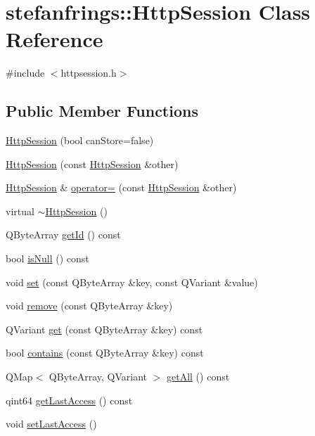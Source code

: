 \hypertarget{classstefanfrings_1_1_http_session}{}\section{stefanfrings\+:\+:Http\+Session Class Reference}
\label{classstefanfrings_1_1_http_session}


{\ttfamily \#include $<$httpsession.\+h$>$}

\subsection*{Public Member Functions}
\begin{DoxyCompactItemize}
\item 
\mbox{\hyperlink{classstefanfrings_1_1_http_session_a9e29f7cbde568d40b2613c3cb3ac2eab}{Http\+Session}} (bool can\+Store=false)
\item 
\mbox{\hyperlink{classstefanfrings_1_1_http_session_a019a110a75a3abdba2ad456848e989a2}{Http\+Session}} (const \mbox{\hyperlink{classstefanfrings_1_1_http_session}{Http\+Session}} \&other)
\item 
\mbox{\hyperlink{classstefanfrings_1_1_http_session}{Http\+Session}} \& \mbox{\hyperlink{classstefanfrings_1_1_http_session_a7b72ecf4dfe0935545c461f461a8a1a5}{operator=}} (const \mbox{\hyperlink{classstefanfrings_1_1_http_session}{Http\+Session}} \&other)
\item 
virtual \mbox{\hyperlink{classstefanfrings_1_1_http_session_afb9e986ea06dc1cb767d3d6fbf6f420c}{$\sim$\+Http\+Session}} ()
\item 
Q\+Byte\+Array \mbox{\hyperlink{classstefanfrings_1_1_http_session_a40a020b5fa0350f28fd40891642c967e}{get\+Id}} () const
\item 
bool \mbox{\hyperlink{classstefanfrings_1_1_http_session_a195963a20805ad00e0eacd90c0194d84}{is\+Null}} () const
\item 
void \mbox{\hyperlink{classstefanfrings_1_1_http_session_a777e082016803939b9ba5b7e4a7c9ab0}{set}} (const Q\+Byte\+Array \&key, const Q\+Variant \&value)
\item 
void \mbox{\hyperlink{classstefanfrings_1_1_http_session_a57e5a59ce0106b0fa8cf9c4086d5a6b1}{remove}} (const Q\+Byte\+Array \&key)
\item 
Q\+Variant \mbox{\hyperlink{classstefanfrings_1_1_http_session_a6e5ae2c6d598511ca64acca9be0421be}{get}} (const Q\+Byte\+Array \&key) const
\item 
bool \mbox{\hyperlink{classstefanfrings_1_1_http_session_a5941c26024d0f026ae11668321353f70}{contains}} (const Q\+Byte\+Array \&key) const
\item 
Q\+Map$<$ Q\+Byte\+Array, Q\+Variant $>$ \mbox{\hyperlink{classstefanfrings_1_1_http_session_af38355ceaf0489097916a98ec0a0c736}{get\+All}} () const
\item 
qint64 \mbox{\hyperlink{classstefanfrings_1_1_http_session_ab6cc679fbcfe56aceea35b4efaacf967}{get\+Last\+Access}} () const
\item 
void \mbox{\hyperlink{classstefanfrings_1_1_http_session_a3e27faa5905e05aefa8feca7fbddfb70}{set\+Last\+Access}} ()
\end{DoxyCompactItemize}


